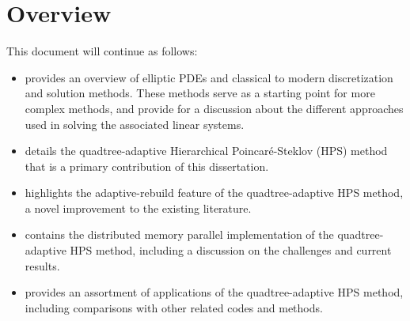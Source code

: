 \section{Overview}

This document will continue as follows:

\begin{itemize}
    \item{ provides an overview of elliptic PDEs and classical to modern discretization and solution methods. These methods serve as a starting point for more complex methods, and provide for a discussion about the different approaches used in solving the associated linear systems.}
    \item{ details the quadtree-adaptive Hierarchical Poincaré-Steklov (HPS) method that is a primary contribution of this dissertation.}
    \item{ highlights the adaptive-rebuild feature of the quadtree-adaptive HPS method, a novel improvement to the existing literature.}
    \item{ contains the distributed memory parallel implementation of the quadtree-adaptive HPS method, including a discussion on the challenges and current results.}
    \item{ provides an assortment of applications of the quadtree-adaptive HPS method, including comparisons with other related codes and methods.}
\end{itemize}